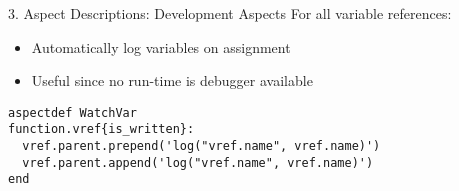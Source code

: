\begin{frame}[fragile]{3. Aspect Descriptions: Development Aspects}
  For all variable references:
  \begin{itemize}
  \item Automatically log variables on assignment
  \item Useful since no run-time is debugger available
  \end{itemize}
  \begin{lstlisting}[label=lst:label, style=lara]
aspectdef WatchVar
function.vref{is_written}:
  vref.parent.prepend('log("vref.name", vref.name)')
  vref.parent.append('log("vref.name", vref.name)')
end
  \end{lstlisting}
\end{frame}
